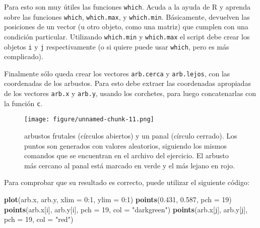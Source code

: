 \documentclass[]{article}
\makeatletter
\newenvironment{Shaded}{}{}
\newcommand{\KeywordTok}[1]{\textcolor[rgb]{0.00,0.44,0.13}{\textbf{{#1}}}}
\newcommand{\DataTypeTok}[1]{\textcolor[rgb]{0.56,0.13,0.00}{{#1}}}
\newcommand{\DecValTok}[1]{\textcolor[rgb]{0.25,0.63,0.44}{{#1}}}
\newcommand{\FloatTok}[1]{\textcolor[rgb]{0.25,0.63,0.44}{{#1}}}
\newcommand{\StringTok}[1]{\textcolor[rgb]{0.25,0.44,0.63}{{#1}}}
\newcommand{\NormalTok}[1]{{#1}}
\def\maxwidth{\ifdim\Gin@nat@width>\linewidth\linewidth
\else\Gin@nat@width\fi}
\let\Oldincludegraphics\includegraphics
\renewcommand{\includegraphics}[1]{\Oldincludegraphics[width=\maxwidth]{#1}}
\makeatother
\begin{document}
Para esto son muy útiles las funciones \texttt{which}. Acuda a la ayuda
de R y aprenda sobre las funciones \texttt{which}, \texttt{which.max}, y
\texttt{which.min}. Básicamente, devuelven las posiciones de un vector
(u otro objeto, como una matriz) que cumplen con una condición
particular. Utilizando \texttt{which.min} y \texttt{which.max} el script
debe crear los objetos \texttt{i} y \texttt{j} respectivamente (o si
quiere puede usar \texttt{which}, pero es más complicado).

Finalmente sólo queda crear los vectores \texttt{arb.cerca} y
\texttt{arb.lejos}, con las coordenadas de los arbustos. Para esto debe
extraer las coordenadas apropiadas de los vectores \texttt{arb.x} y
\texttt{arb.y}, usando los corchetes, para luego concatenarlas con la
función \texttt{c}.

\begin{figure}[htbp]
\centering
\texttt{[image: figure/unnamed-chunk-11.png]}
\caption{arbustos frutales (círculos abiertos) y un panal (círculo
cerrado). Los puntos son generados con valores aleatorios, siguiendo los
mismos comandos que se encuentran en el archivo del ejercicio. El
arbusto más cercano al panal está marcado en verde y el más lejano en
rojo.}
\end{figure}

Para comprobar que su resultado es correcto, puede utilizar el siguiente
código:

\begin{Shaded}
\begin{Highlighting}[]
\KeywordTok{plot}\NormalTok{(arb.x, arb.y, }\DataTypeTok{xlim =} \DecValTok{0}\NormalTok{:}\DecValTok{1}\NormalTok{, }\DataTypeTok{ylim =} \DecValTok{0}\NormalTok{:}\DecValTok{1}\NormalTok{)}
\KeywordTok{points}\NormalTok{(}\FloatTok{0.431}\NormalTok{, }\FloatTok{0.587}\NormalTok{, }\DataTypeTok{pch =} \DecValTok{19}\NormalTok{)}
\KeywordTok{points}\NormalTok{(arb.x[i], arb.y[i], }\DataTypeTok{pch =} \DecValTok{19}\NormalTok{, }\DataTypeTok{col =} \StringTok{"darkgreen"}\NormalTok{)}
\KeywordTok{points}\NormalTok{(arb.x[j], arb.y[j], }\DataTypeTok{pch =} \DecValTok{19}\NormalTok{, }\DataTypeTok{col =} \StringTok{"red"}\NormalTok{)}
\end{Highlighting}
\end{Shaded}
\end{document}
